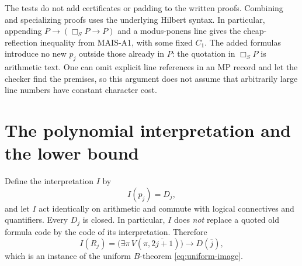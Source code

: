 \documentclass[11pt]{article}
\theoremstyle{remark}
\newcommand{\num}[1]{\overline{#1}}
\begin{document}
The tests do not add certificates or padding to the written proofs.
Combining and specializing proofs uses the underlying Hilbert syntax.
In particular, appending $P\to(\Box_S P\to P)$ and a modus-ponens line
gives the cheap-reflection inequality from MAIS-A1, with some fixed $C_1$.
The added formulas introduce no new $p_j$ outside those already in $P$:
the quotation in $\Box_S P$ is arithmetic text. One can omit explicit
line references in an MP record and let the checker find the premises,
so this argument does not assume that arbitrarily large line numbers
have constant character cost.

\section{The polynomial interpretation and the lower bound}

Define the interpretation $I$ by
\[
 I(p_j)=D_j,
\]
and let $I$ act identically on arithmetic and commute with logical
connectives and quantifiers. Every $D_j$ is closed. In particular, $I$
does \emph{not} replace a quoted old formula code by the code of its
interpretation. Therefore
\begin{equation}\label{eq:translated-reflection}
 I(R_j)=\bigl(\exists\pi\,V(\pi,\num{2j+1})\bigr)\to D(\num j),
\end{equation}
which is an instance of the uniform $B$-theorem
\eqref{eq:uniform-image}.
\end{document}
